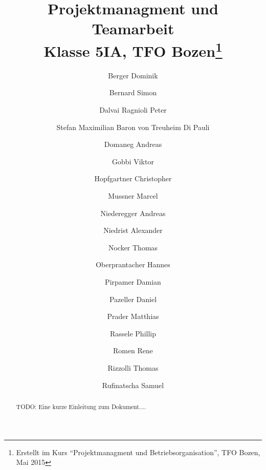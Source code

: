 \documentclass{article}
\title{Projektmanagment und Teamarbeit\\Klasse 5IA, TFO Bozen\thanks{Erstellt 
im Kurs ``Projektmanagment und Betriebsorganisation'', TFO Bozen, Mai 2015}}
\author{Berger Dominik
\and Bernard Simon
\and Dalvai Ragnioli Peter
\and Stefan Maximilian Baron von Treuheim Di Pauli
\and Domaneg Andreas
\and Gobbi Viktor
\and Hopfgartner Christopher
\and Mussner Marcel
\and Niederegger Andreas
\and Niedrist Alexander
\and Nocker Thomas
\and Oberprantacher Hannes
\and Pirpamer Damian
\and Pazeller Daniel
\and Prader Matthias
\and Rassele Phillip
\and Romen Rene
\and Rizzolli Thomas
\and Rufinatscha Samuel}
\begin{document}
\maketitle


\begin{abstract}
 TODO: Eine kurze Einleitung zum Dokument....
\end{abstract}

\newpage


\begin{sloppypar}
\tableofcontents
\listoffigures






















\end{sloppypar}
\end{document}
